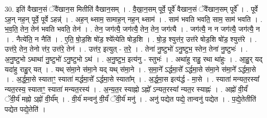 \documentclass[17pt]{extarticle}
\begin{document}
30. इति॑ वैखान॒सं ॅवै॑खान॒स मितीति॑ वैखान॒सम् । . वै॒खा॒न॒सम् पूर्वे॒ पूर्वे॑ वैखान॒सं ॅवै॑खान॒सम् पूर्वे᳚ । . पूर्वे ऽह॒न् नह॒न् पूर्वे॒ पूर्वे ऽहन्न्॑ । . अह॒न् थ्साम॒ सामाह॒न् नह॒न् थ्साम॑ । . साम॑ भवति भवति॒ साम॒ साम॑ भवति । . भ॒व॒ति॒ तेन॒ तेन॑ भवति भवति॒ तेन॑ । . तेन॒ जग॑त्यै॒ जग॑त्यै॒ तेन॒ तेन॒ जग॑त्यै । . जग॑त्यै॒ न न जग॑त्यै॒ जग॑त्यै॒ न । . नैत्ये॑ति॒ न नैति॑ । . ए॒ति॒ षो॒ड॒शि षो॑ड॒ श्ये᳚त्येति षोड॒शि । . षो॒ड॒ श्युत्त॑र॒ उत्त॑रे षोड॒शि षो॑ड॒ श्युत्त॑रे । . उत्त॑रे॒ तेन॒ तेनो त्त॑र॒ उत्त॑रे॒ तेन॑ । . उत्त॑र॒ इत्युत् - त॒रे॒ । . तेना॑ नु॒ष्टुभो॑ ऽनु॒ष्टुभ॒ स्तेन॒ तेना॑ नु॒ष्टुभः॑ । . अ॒नु॒ष्टुभो ऽथाथा॑ नु॒ष्टुभो॑ ऽनु॒ष्टुभो ऽथ॑ । . अ॒नु॒ष्टुभ॒ इत्य॑नु - स्तुभः॑ । . अथा॑हु राहु॒ रथा था॑हुः । . आ॒हु॒र् यद् यदा॑हु राहु॒र् यत् । . यथ् स॑मा॒ने स॑मा॒ने यद् यथ् स॑मा॒ने । . स॒मा॒ने᳚ ऽर्द्धमा॒से᳚ ऽर्द्धमा॒से स॑मा॒ने स॑मा॒ने᳚ ऽर्द्धमा॒से । . अ॒र्द्ध॒मा॒से स्याताꣳ॒॒ स्याता॑ मर्द्धमा॒से᳚ ऽर्द्धमा॒से स्याता᳚म् । . अ॒र्द्ध॒मा॒स इत्य॑र्द्ध - मा॒से । . स्याता॑ मन्यत॒रस्या᳚ न्यत॒रस्य॒ स्याताꣳ॒॒ स्याता॑ मन्यत॒रस्य॑ । . अ॒न्य॒त॒र स्याह्नो ऽह्नो᳚ ऽन्यत॒रस्या᳚ न्यत॒र स्याह्नः॑ । . अह्नो॑ वी॒र्यं॑ ॅवी॒र्य॑ मह्नो ऽह्नो॑ वी॒र्य᳚म् । . वी॒र्य॑ मन्वनु॑ वी॒र्यं॑ ॅवी॒र्य॑ मनु॑ । . अनु॑ पद्येत पद्ये॒ तान्वनु॑ पद्येत । . प॒द्ये॒तेतीति॑ पद्येत पद्ये॒तेति॑ । \newline
\end{document}
